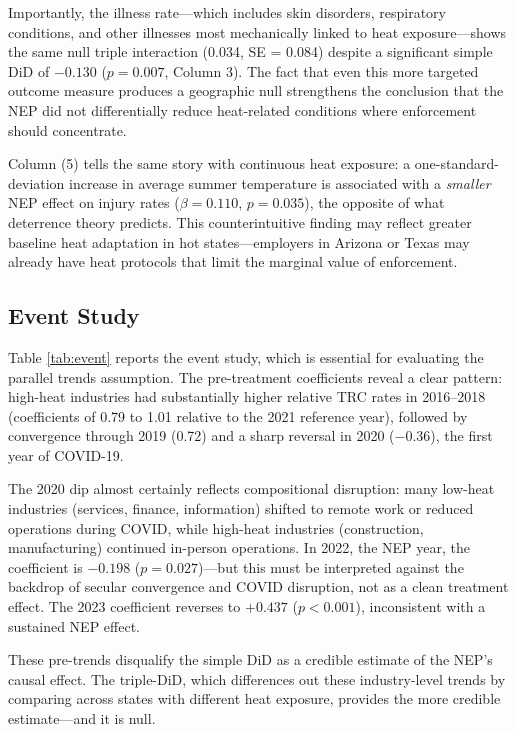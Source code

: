 \documentclass[12pt]{article}
\begin{document}
Importantly, the illness rate---which includes skin disorders, respiratory conditions, and other illnesses most mechanically linked to heat exposure---shows the same null triple interaction (0.034, SE = 0.084) despite a significant simple DiD of $-0.130$ ($p = 0.007$, Column 3). The fact that even this more targeted outcome measure produces a geographic null strengthens the conclusion that the NEP did not differentially reduce heat-related conditions where enforcement should concentrate.

Column (5) tells the same story with continuous heat exposure: a one-standard-deviation increase in average summer temperature is associated with a \textit{smaller} NEP effect on injury rates ($\beta = 0.110$, $p = 0.035$), the opposite of what deterrence theory predicts. This counterintuitive finding may reflect greater baseline heat adaptation in hot states---employers in Arizona or Texas may already have heat protocols that limit the marginal value of enforcement.

\subsection{Event Study}



Table \ref{tab:event} reports the event study, which is essential for evaluating the parallel trends assumption. The pre-treatment coefficients reveal a clear pattern: high-heat industries had substantially higher relative TRC rates in 2016--2018 (coefficients of 0.79 to 1.01 relative to the 2021 reference year), followed by convergence through 2019 (0.72) and a sharp reversal in 2020 ($-0.36$), the first year of COVID-19.

The 2020 dip almost certainly reflects compositional disruption: many low-heat industries (services, finance, information) shifted to remote work or reduced operations during COVID, while high-heat industries (construction, manufacturing) continued in-person operations. In 2022, the NEP year, the coefficient is $-0.198$ ($p = 0.027$)---but this must be interpreted against the backdrop of secular convergence and COVID disruption, not as a clean treatment effect. The 2023 coefficient reverses to $+0.437$ ($p < 0.001$), inconsistent with a sustained NEP effect.

These pre-trends disqualify the simple DiD as a credible estimate of the NEP's causal effect. The triple-DiD, which differences out these industry-level trends by comparing across states with different heat exposure, provides the more credible estimate---and it is null.
\end{document}
